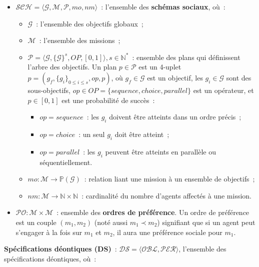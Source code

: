 \begin{itemize}
  \item $\mathcal{SCH} = \langle\mathcal{G}, \mathcal{M}, \mathcal{P}, mo, nm \rangle$~: l'ensemble des \textbf{schémas sociaux}, où~:
        \begin{itemize}
          \item $\mathcal{G}$~: l'ensemble des objectifs globaux~;
          \item $\mathcal{M}$~: l'ensemble des missions~;
          \item $\mathcal{P} = \langle \mathcal{G}, \{\mathcal{G}\}^s, OP, [0,1] \rangle, s \in \mathbb{N}^*$~: ensemble des plans qui définissent l'arbre des objectifs.
                Un plan $p \in \mathcal{P}$ est un 4-uplet $p = (g_f, \{g_i\}_{0 \leq i \leq s}, op, p)$, où $g_f \in \mathcal{G}$ est un objectif, les $g_i \in \mathcal{G}$ sont des sous-objectifs, $op \in OP = \{sequence, choice, parallel\}$ est un opérateur, et $p \in [0,1]$ est une probabilité de succès~:
                \begin{itemize}
                  \item $op = sequence$~: les $g_i$ doivent être atteints dans un ordre précis~;
                  \item $op = choice$~: un seul $g_i$ doit être atteint~;
                  \item $op = parallel$~: les $g_i$ peuvent être atteints en parallèle ou séquentiellement.
                \end{itemize}
          \item $mo: \mathcal{M} \rightarrow \mathbb{P}(\mathcal{G})$~: relation liant une mission à un ensemble de objectifs~;
          \item $nm: \mathcal{M} \rightarrow \mathbb{N} \times \mathbb{N}$~: cardinalité du nombre d'agents affectés à une mission.
        \end{itemize}
  \item $\mathcal{PO}: \mathcal{M} \times \mathcal{M}$~: ensemble des \textbf{ordres de préférence}. Un ordre de préférence est un couple $(m_1, m_2)$ (noté aussi $m_1 \prec m_2$) signifiant que si un agent peut s'engager à la fois sur $m_1$ et $m_2$, il aura une préférence sociale pour $m_1$.
\end{itemize}

\medskip

\noindent \textbf{Spécifications déontiques (DS)}~: \quad $\mathcal{DS} = \langle \mathcal{OBL}, \mathcal{PER} \rangle$, l'ensemble des spécifications déontiques, où~:


